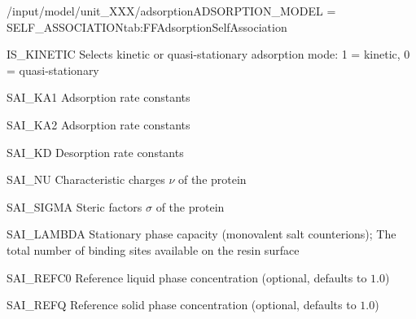 \begin{condsubgroup}{/input/model/unit\_XXX/adsorption}{ADSORPTION\_MODEL = SELF\_ASSOCIATION}{tab:FFAdsorptionSelfAssociation}
\begin{dataset}[type=int,range={$\{ 0,1 \}$},length=1]{IS\_KINETIC}
    Selects kinetic or quasi-stationary adsorption mode: 1 = kinetic, 0 = quasi-stationary
  \end{dataset}
  \begin{dataset}[unit=\si{\raiseto{3}\metre\of{MP}\per\raiseto{3}\metre\of{SP}\per\second}, type=double,range={$\geq 0$},length={\texttt{NCOMP}}]{SAI\_KA1}
    Adsorption rate constants
  \end{dataset}
  \begin{dataset}[unit=\si{\raiseto{6}\metre\of{MP}\per\raiseto{6}\metre\of{SP}\per\second}, type=double,range={$\geq 0$},length={\texttt{NCOMP}}]{SAI\_KA2}
    Adsorption rate constants
  \end{dataset}
  \begin{dataset}[unit=\si{\per\second}, type=double,range={$\geq 0$},length={\texttt{NCOMP}}]{SAI\_KD}
    Desorption rate constants
  \end{dataset}
  \begin{dataset}[type=double,range={$\geq 0$},length={\texttt{NCOMP}}]{SAI\_NU}
    Characteristic charges $\nu$ of the protein
  \end{dataset}
  \begin{dataset}[type=double,range={$\geq 0$},length={\texttt{NCOMP}}]{SAI\_SIGMA}
    Steric factors $\sigma$ of the protein
  \end{dataset}
  \begin{dataset}[unit=\si{\mol\per\cubic\metre\of{SP}}, type=double,range={$\geq 0$},length={1}]{SAI\_LAMBDA}
    Stationary phase capacity (monovalent salt counterions); The total number of binding sites available on the resin surface
  \end{dataset}
  \begin{dataset}[unit=\si{\mol\per\raiseto{3}\metre\of{MP}}, type=double,range={$> 0$},length={1}]{SAI\_REFC0}
    Reference liquid phase concentration (optional, defaults to $1.0$)
  \end{dataset}
  \begin{dataset}[unit=\si{\mol\per\raiseto{3}\metre\of{SP}}, type=double,range={$> 0$},length={1}]{SAI\_REFQ}
    Reference solid phase concentration (optional, defaults to $1.0$) 
  \end{dataset}
\end{condsubgroup}

